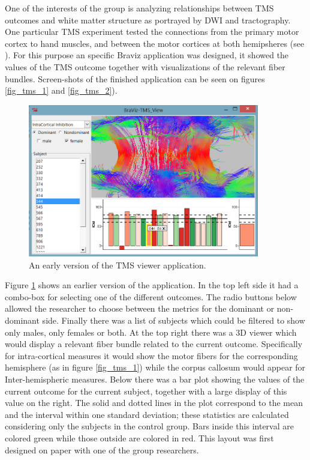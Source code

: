 
One of the interests of the group is analyzing relationships between TMS outcomes and white matter structure as portrayed by DWI and tractography. One particular TMS experiment tested the connections from the primary motor cortex to hand muscles, and between the motor cortices at both hemipsheres (see \autocite{schneider_cerebral_2012}). For this purpose an specific Braviz application was designed, it showed the values of the TMS outcome together with visualizations of the relevant fiber bundles. Screen-shots of the finished application can be seen on figures \ref{fig_tms_1} and \ref{fig_tms_2}). 

\begin{figure}
	\centering
		\includegraphics[width=0.90\textwidth]{figures/analysis/tms_view_early}
	\caption{An early version of the TMS viewer application.}
	\label{fig_tms_view_early}
\end{figure}

Figure \ref{fig_tms_view_early} shows an earlier version of the application. In the top left side it had a combo-box for selecting one of the different outcomes. The radio buttons below allowed the researcher to choose between the metrics for the dominant or non-dominant side. Finally there was a list of subjects which could be filtered to show only males, only females or both. At the top right there was a 3D viewer which would display a relevant fiber bundle related to the current outcome. Specifically for intra-cortical measures it would show the motor fibers for the corresponding hemisphere (as in figure \ref{fig_tms_1}) while the corpus callosum would appear for Inter-hemispheric measures.
Below there was a bar plot showing the values of the current outcome for the current subject, together with a large display of this value on the right. The solid and dotted lines in the plot correspond to the mean and the interval within one standard deviation; these statistics are calculated considering only the subjects in the control group. Bars inside this interval are colored green while those outside are colored in red.
This layout was first designed on paper with one of the group researchers. 

